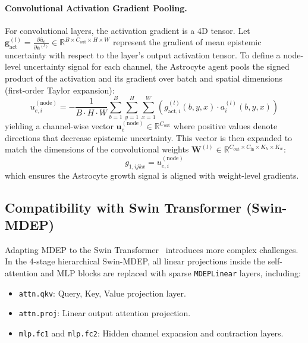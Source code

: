 \documentclass[letterpaper]{article} %
\newcommand{\R}{\mathbb{R}}
\begin{document}
\paragraph{Convolutional Activation Gradient Pooling.}
For convolutional layers, the activation gradient is a 4D tensor. Let $\bm{g}_{\text{act}}^{(l)} = \frac{\partial \bar{u}_e}{\partial \bm{a}^{(l)}} \in \R^{B \times C_{\text{out}} \times H \times W}$ represent the gradient of mean epistemic uncertainty with respect to the layer's output activation tensor. To define a node-level uncertainty signal for each channel, the Astrocyte agent pools the signed product of the activation and its gradient over batch and spatial dimensions (first-order Taylor expansion):
\begin{equation}\label{eq:conv_pooling}
    u_{e,i}^{(\text{node})} = - \frac{1}{B \cdot H \cdot W} \sum_{b=1}^B \sum_{y=1}^H \sum_{x=1}^W \left( g_{\text{act}, i}^{(l)}(b, y, x) \cdot a_i^{(l)}(b, y, x) \right)
\end{equation}
yielding a channel-wise vector $\bm{u}_e^{(\text{node})} \in \R^{C_{\text{out}}}$ where positive values denote directions that decrease epistemic uncertainty. This vector is then expanded to match the dimensions of the convolutional weights $\bm{W}^{(l)} \in \R^{C_{\text{out}} \times C_{\text{in}} \times K_h \times K_w}$:
\begin{equation}
    g_{1, ijkx} = u_{e,i}^{(\text{node})}
\end{equation}
which ensures the Astrocyte growth signal is aligned with weight-level gradients.

\subsection{Compatibility with Swin Transformer (Swin-MDEP)}\label{subsec:swin}

Adapting MDEP to the Swin Transformer~\cite{liu2021swin, liu2022swinv2} introduces more complex challenges. In the 4-stage hierarchical Swin-MDEP, all linear projections inside the self-attention and MLP blocks are replaced with sparse \texttt{MDEPLinear} layers, including:
\begin{itemize}
    \item \texttt{attn.qkv}: Query, Key, Value projection layer.
    \item \texttt{attn.proj}: Linear output attention projection.
    \item \texttt{mlp.fc1} and \texttt{mlp.fc2}: Hidden channel expansion and contraction layers.
\end{itemize}
\end{document}
